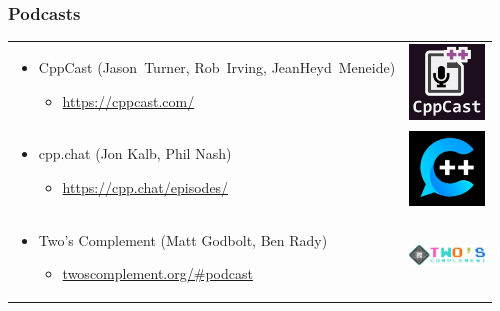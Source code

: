 \documentclass{beamer}
\begin{document}
\begin{frame}
\frametitle{Podcasts}
{\centering
\begin{tabular}{m{8.5cm} m{2cm}}
\begin{itemize}
  \item CppCast (Jason~Turner, Rob~Irving, JeanHeyd~Meneide)
  \begin{itemize}
    \item \url{https://cppcast.com/}
  \end{itemize}
\end{itemize} &
\includegraphics[width=2cm]{pics/cppcast.png} \\

\begin{itemize}
  \item cpp.chat (Jon Kalb, Phil Nash)
  \begin{itemize}
    \item \url{https://cpp.chat/episodes/}
  \end{itemize}
\end{itemize} &
\includegraphics[width=2cm]{pics/cppchat.jpg} \\

\begin{itemize}
  \item Two's Complement (Matt Godbolt, Ben Rady)
  \begin{itemize}
    \item \href{https://www.twoscomplement.org/\#podcast}{twoscomplement.org/\#podcast}
  \end{itemize}
\end{itemize} &
\includegraphics[width=2cm]{pics/twc.png} \\
\end{tabular}
}
\end{frame}
\end{document}
